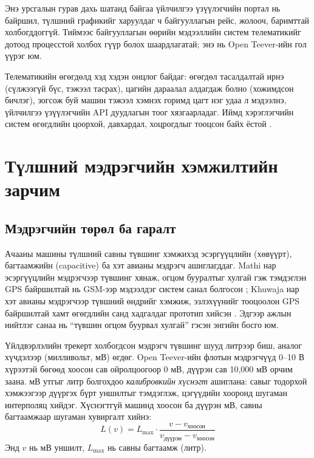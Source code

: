 \documentclass[
12pt,
oneside,
english,
onehalfspacing,
nolistspacing,
headsepline,
]{MUST-Thesis}
\begin{document}
Энэ урсгалын гурав дахь шатанд байгаа үйлчилгээ үзүүлэгчийн портал нь байршил, түлшний графикийг харуулдаг ч байгууллагын рейс, жолооч, баримттай холбогддоггүй. Тиймээс байгууллагын өөрийн мэдээллийн систем телематикийг дотоод процесстой холбох гүүр болох шаардлагатай; энэ нь Open Teever-ийн гол үүрэг юм.

Телематикийн өгөгдөлд хэд хэдэн онцлог байдаг: өгөгдөл тасалдалтай ирнэ (сүлжээгүй бүс, тэжээл тасрах), цагийн дараалал алдагдаж болно (хожимдсон бичлэг), зогсож буй машин тэжээл хэмнэх горимд цагт нэг удаа л мэдээлнэ, үйлчилгээ үзүүлэгчийн API дуудлагын тоог хязгаарладаг. Иймд хэрэглэгчийн систем өгөгдлийн цоорхой, давхардал, хоцрогдлыг тооцсон байх ёстой \cite{kleppmann2017ddia}.

\section{Түлшний мэдрэгчийн хэмжилтийн зарчим}

\subsection{Мэдрэгчийн төрөл ба гаралт}

Ачааны машины түлшний савны түвшинг хэмжихэд эсэргүүцлийн (хөвүүрт), багтаамжийн (capacitive) ба хэт авианы мэдрэгч ашиглагддаг. Mathi нар эсэргүүцлийн мэдрэгчээр түвшинг хянаж, огцом бууралтыг хулгай гэж тэмдэглэн GPS байршилтай нь GSM-ээр мэдээлдэг систем санал болгосон \cite{mathi2024fuel}; Khuwaja нар хэт авианы мэдрэгчээр түвшний өндрийг хэмжиж, эзлэхүүнийг тооцоолон GPS байршилтай хамт өгөгдлийн санд хадгалдаг прототип хийсэн \cite{khuwaja2018fuel}. Эдгээр ажлын нийтлэг санаа нь ``түвшин огцом буурвал хулгай'' гэсэн энгийн босго юм.

Үйлдвэрлэлийн трекерт холбогдсон мэдрэгч түвшинг шууд литрээр биш, аналог хүчдэлээр (милливольт, мВ) өгдөг. Open Teever-ийн флотын мэдрэгчүүд 0--10 В хүрээтэй бөгөөд хоосон сав ойролцоогоор 0 мВ, дүүрэн сав 10,000 мВ орчим заана. мВ утгыг литр болгохдоо \textit{калибровкийн хүснэгт} ашиглана: савыг тодорхой хэмжээгээр дүүргэх бүрт уншилтыг тэмдэглэж, цэгүүдийн хооронд шугаман интерполяц хийдэг. Хүснэгтгүй машинд хоосон ба дүүрэн мВ, савны багтаамжаар шугаман хувиргалт хийнэ:
\begin{equation}
L(v) = L_{\max}\cdot\frac{v - v_{\text{хоосон}}}{v_{\text{дүүрэн}} - v_{\text{хоосон}}}
\label{eq:ch2-linear}
\end{equation}
Энд $v$ нь мВ уншилт, $L_{\max}$ нь савны багтаамж (литр).
\end{document}
